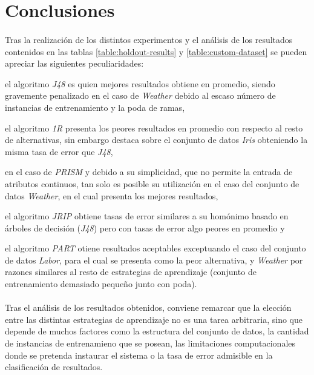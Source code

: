 \documentclass{article}
\begin{document}
	\section{Conclusiones}
	\label{sec:conclusions}

		\paragraph{}
		Tras la realización de los distintos experimentos y el análisis de los resultados contenidos en las tablas \ref{table:holdout-results} y \ref{table:custom-dataset} se pueden apreciar las siguientes peculiaridades:
		\begin {enumerate*} [label=\itshape\alph*\upshape)]

			\item el algoritmo \emph{J48} es quien mejores resultados obtiene en promedio, siendo gravemente penalizado en el caso de \emph{Weather} debido al escaso número de instancias de entrenamiento y la poda de ramas,

			\item el algoritmo \emph{1R} presenta los peores resultados en promedio con respecto al resto de alternativas, sin embargo destaca sobre el conjunto de datos \emph{Iris} obteniendo la misma tasa de error que \emph{J48},

			\item en el caso de \emph{PRISM} y debido a su simplicidad, que no permite la entrada de atributos continuos,  tan solo es posible su utilización en el caso del conjunto de datos \emph{Weather}, en el cual presenta los mejores resultados,

			\item el algoritmo \emph{JRIP} obtiene tasas de error similares a su homónimo basado en árboles de decisión (\emph{J48}) pero con tasas de error algo peores en promedio y

			\item el algoritmo \emph{PART} otiene resultados aceptables exceptuando el caso del conjunto de datos \emph{Labor}, para el cual se presenta como la peor alternativa, y \emph{Weather} por razones similares al resto de estrategias de aprendizaje (conjunto de entrenamiento demasiado pequeño junto con poda).
		\end {enumerate*}

		\paragraph{}
		Tras el análisis de los resultados obtenidos, conviene remarcar que la elección entre las distintas estrategias de aprendizaje no es una tarea arbitraria, sino que depende de muchos factores como la estructura del conjunto de datos, la cantidad de instancias de entrenamieno que se posean, las limitaciones computacionales donde se pretenda instaurar el sistema o la tasa de error admisible en la clasificación de resultados.


	\newpage
	\nocite{garciparedes:machine-learning-decision-trees-and-rules}
	\nocite{subject:taa}
	\nocite{tool:weka}
  
  
\end{document}
